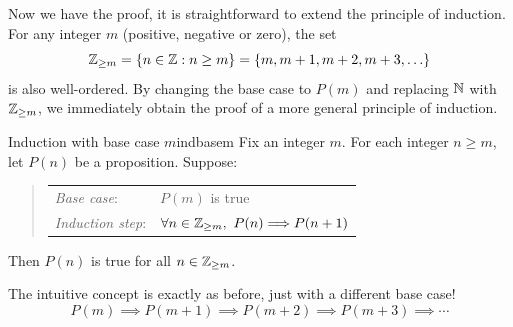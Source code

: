 Now we have the proof, it is straightforward to extend the principle of induction. For any integer $m$ (positive, negative or zero), the set
\[
	\mathbb{Z}_{\ge m}=\{n\in\mathbb{Z}:n\ge m\}=\{m,m+1,m+2,m+3,\ldots\}
\]
is also well-ordered. By changing the base case to $P(m)$ and replacing $\mathbb{N}$ with $\mathbb{Z}_{\ge m}$, we immediately obtain the proof of a more general principle of induction.

\begin{cor}{Induction with base case $m$}{indbasem}
	Fix an integer $m$. For each integer $n\ge m$, let $P(n)$ be a proposition. Suppose:
	\begin{quote}
		\begin{tabular}{@{}ll}
			\emph{Base case}: &$P(m)$ is true\\[5pt]
			\emph{Induction step}: &$\forall n\in\mathbb{Z}_{\ge m},\ P(n)\Longrightarrow P(n+1)$
		\end{tabular}
	\end{quote}
	Then $P(n)$ is true for all $n\in\mathbb{Z}_{\ge m}$.
\end{cor}

The intuitive concept is exactly as before, just with a different base case!
\[
	P(m)\implies P(m+1)\implies P(m+2)\implies P(m+3)\implies\cdots
\]
\goodbreak





